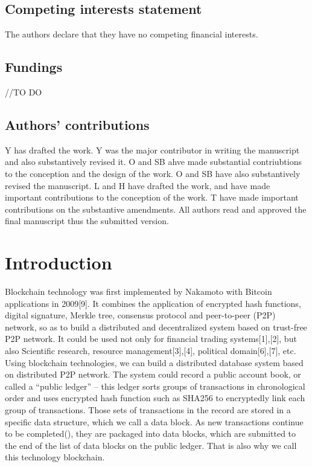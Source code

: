 \documentclass[doublespacing]{bmcart}
\begin{document}
\begin{CJK*}{UTF8}{gbsn}
\subsection*{\centering Competing interests statement}


The authors declare that they have no competing financial interests.

\subsection*{\centering Fundings}


//TO DO

\subsection*{\centering Authors' contributions}
Y has drafted the work. Y was the major contributor in writing the manuscript and also substantively revised it. O and SB ahve made substantial contriubtions to the conception and the design of the work. O and SB have also substantively revised the manuscript. L and H have drafted the work, and have made important contributions to the conception of the work. T have made important contributions on the substantive amendments. All authors read and approved the final manuscript thus the submitted version.




\section{Introduction}

Blockchain technology was first implemented by Nakamoto with Bitcoin applications in 2009[9]. It combines the application of encrypted hash functions, digital signature, Merkle tree, consensus protocol and peer-to-peer (P2P) network, so as to build a distributed and decentralized system based on trust-free P2P network. It could be used not only for financial trading systems[1],[2], but also Scientific  research,  resource management[3],[4], political domain[6],[7], etc. Using blockchain technologies, we can build a distributed database system based on distributed P2P network. The system could record a public account book, or called a ``public ledger'' – this ledger sorts groups of transactions in chronological order and uses encrypted hash function such as SHA256 to encryptedly link each group of transactions. Those sets of transactions in the record are stored in a specific data structure, which we call a data block. As new transactions continue to be completed(), they are packaged into data blocks, which are submitted to the end of the list of data blocks on the public ledger. That is also why we call this technology blockchain.
	

\end{CJK*}
\end{document}
